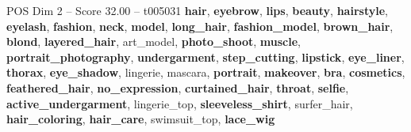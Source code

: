 \begin{textsample}{POS Dim 2 – Score 32.00 – t005031}  \label{ex:f2_pos_003}
\textbf{hair}, \textbf{eyebrow}, \textbf{lips}, \textbf{beauty}, \textbf{hairstyle}, \textbf{eyelash}, \textbf{fashion}, \textbf{neck}, \textbf{model}, \textbf{long\_hair}, \textbf{fashion\_model}, \textbf{brown\_hair}, \textbf{blond}, \textbf{layered\_hair}, art\_model, \textbf{photo\_shoot}, \textbf{muscle}, \textbf{portrait\_photography}, \textbf{undergarment}, \textbf{step\_cutting}, \textbf{lipstick}, \textbf{eye\_liner}, \textbf{thorax}, \textbf{eye\_shadow}, lingerie, mascara, \textbf{portrait}, \textbf{makeover}, \textbf{bra}, \textbf{cosmetics}, \textbf{feathered\_hair}, \textbf{no\_expression}, \textbf{curtained\_hair}, \textbf{throat}, \textbf{selfie}, \textbf{active\_undergarment}, lingerie\_top, \textbf{sleeveless\_shirt}, surfer\_hair, \textbf{hair\_coloring}, \textbf{hair\_care}, swimsuit\_top, \textbf{lace\_wig}

\end{textsample}
